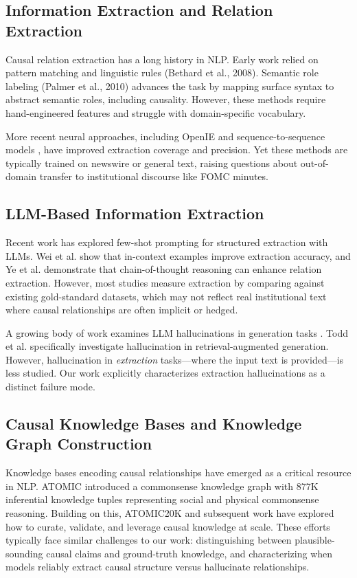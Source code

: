 \documentclass[11pt]{article}
\begin{document}
\subsection{Information Extraction and Relation Extraction}

Causal relation extraction has a long history in NLP. Early work relied on pattern matching and linguistic rules (Bethard et al., 2008). Semantic role labeling (Palmer et al., 2010) advances the task by mapping surface syntax to abstract semantic roles, including causality. However, these methods require hand-engineered features and struggle with domain-specific vocabulary.

More recent neural approaches, including OpenIE \cite{banko2007open} and sequence-to-sequence models \cite{cui2020survey}, have improved extraction coverage and precision. Yet these methods are typically trained on newswire or general text, raising questions about out-of-domain transfer to institutional discourse like FOMC minutes.

\subsection{LLM-Based Information Extraction}

Recent work has explored few-shot prompting for structured extraction with LLMs. Wei et al. \cite{wei2022chain} show that in-context examples improve extraction accuracy, and Ye et al. \cite{ye2023towards} demonstrate that chain-of-thought reasoning can enhance relation extraction. However, most studies measure extraction by comparing against existing gold-standard datasets, which may not reflect real institutional text where causal relationships are often implicit or hedged.

A growing body of work examines LLM hallucinations in generation tasks \cite{ji2023survey}. Todd et al. \cite{todd2023counting} specifically investigate hallucination in retrieval-augmented generation. However, hallucination in \textit{extraction} tasks—where the input text is provided—is less studied. Our work explicitly characterizes extraction hallucinations as a distinct failure mode.

\subsection{Causal Knowledge Bases and Knowledge Graph Construction}

Knowledge bases encoding causal relationships have emerged as a critical resource in NLP. ATOMIC \cite{sap2019atomic} introduced a commonsense knowledge graph with 877K inferential knowledge tuples representing social and physical commonsense reasoning. Building on this, ATOMIC20K \cite{hwang2021comet} and subsequent work have explored how to curate, validate, and leverage causal knowledge at scale. These efforts typically face similar challenges to our work: distinguishing between plausible-sounding causal claims and ground-truth knowledge, and characterizing when models reliably extract causal structure versus hallucinate relationships. 
\end{document}
